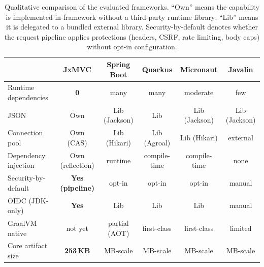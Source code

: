 \begin{table}[t]
  \centering
  \caption{Qualitative comparison of the evaluated frameworks. ``Own''
    means the capability is implemented in-framework without a
    third-party runtime library; ``Lib'' means it is delegated to a
    bundled external library. Security-by-default denotes whether the
    request pipeline applies protections (headers, CSRF, rate limiting,
    body caps) without opt-in configuration.}
  \label{tab:qualitative}
  \small
  \begin{tabular}{@{}lccccc@{}}
    \toprule
    & \textbf{JxMVC} & \textbf{Spring Boot} & \textbf{Quarkus} & \textbf{Micronaut} & \textbf{Javalin} \\
    \midrule
    Runtime dependencies   & \textbf{0}        & many        & many        & moderate    & few \\
    JSON                   & Own               & Lib (Jackson)& Lib        & Lib (Jackson)& Lib (Jackson) \\
    Connection pool        & Own (CAS)         & Lib (Hikari)& Lib (Agroal)& Lib (Hikari)& external \\
    Dependency injection   & Own (reflection)  & runtime     & compile-time& compile-time& none \\
    Security-by-default    & \textbf{Yes (pipeline)} & opt-in & opt-in     & opt-in      & manual \\
    OIDC (JDK-only)        & \textbf{Yes}      & Lib         & Lib         & Lib         & manual \\
    GraalVM native         & not yet           & partial (AOT)& first-class& first-class & limited \\
    Core artifact size     & \textbf{253\,KB}  & MB-scale    & MB-scale    & MB-scale    & MB-scale \\
    \bottomrule
  \end{tabular}
\end{table}
